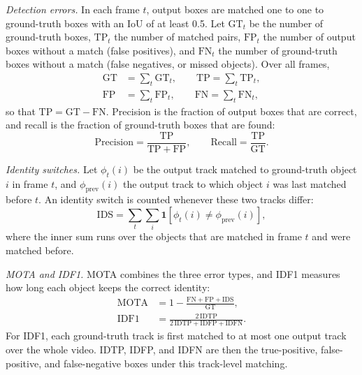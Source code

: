 \documentclass[pdflatex,sn-mathphys-num,iicol]{sn-jnl}
\begin{document}
\emph{Detection errors.} In each frame $t$, output boxes are matched one to
one to ground-truth boxes with an IoU of at least 0.5. Let $\mathrm{GT}_t$ be
the number of ground-truth boxes, $\mathrm{TP}_t$ the number of matched pairs,
$\mathrm{FP}_t$ the number of output boxes without a match (false positives),
and $\mathrm{FN}_t$ the number of ground-truth boxes without a match (false
negatives, or missed objects). Over all frames,
\begin{align}
\mathrm{GT}&=\sum_t \mathrm{GT}_t,\qquad \mathrm{TP}=\sum_t \mathrm{TP}_t,\label{eq:gt}\\
\mathrm{FP}&=\sum_t \mathrm{FP}_t,\qquad \mathrm{FN}=\sum_t \mathrm{FN}_t,\label{eq:fpfn}
\end{align}
so that $\mathrm{TP}=\mathrm{GT}-\mathrm{FN}$. Precision is the fraction of
output boxes that are correct, and recall is the fraction of ground-truth
boxes that are found:
\begin{equation}
\mathrm{Precision}=\frac{\mathrm{TP}}{\mathrm{TP}+\mathrm{FP}},\qquad
\mathrm{Recall}=\frac{\mathrm{TP}}{\mathrm{GT}}.
\label{eq:prrc}
\end{equation}

\emph{Identity switches.} Let $\phi_t(i)$ be the output track matched to
ground-truth object $i$ in frame $t$, and $\phi_{\mathrm{prev}}(i)$ the
output track to which object $i$ was last matched before $t$. An identity
switch is counted whenever these two tracks differ:
\begin{equation}
\mathrm{IDS}=\sum_t\sum_{i}\mathbf{1}\!\left[\phi_t(i)\neq\phi_{\mathrm{prev}}(i)\right],
\label{eq:ids}
\end{equation}
where the inner sum runs over the objects that are matched in frame $t$ and
were matched before.

\emph{MOTA and IDF1.} MOTA combines the three error types, and IDF1 measures
how long each object keeps the correct identity:
\begin{align}
\mathrm{MOTA}&=1-\frac{\mathrm{FN}+\mathrm{FP}+\mathrm{IDS}}{\mathrm{GT}},\label{eq:mota}\\
\mathrm{IDF1}&=\frac{2\,\mathrm{IDTP}}{2\,\mathrm{IDTP}+\mathrm{IDFP}+\mathrm{IDFN}}.\label{eq:idf1}
\end{align}
For IDF1, each ground-truth track is first matched to at most one output
track over the whole video. IDTP, IDFP, and IDFN are then the true-positive,
false-positive, and false-negative boxes under this track-level matching.
\end{document}

